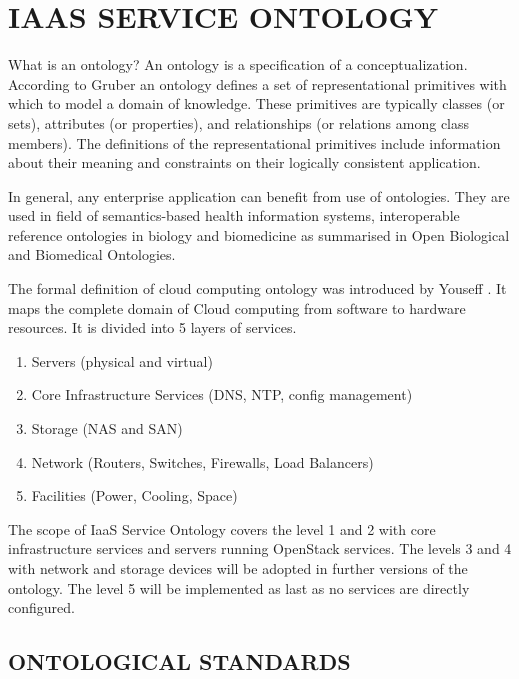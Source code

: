 
\section{IAAS SERVICE ONTOLOGY}
\label{chap:ontology}

What is an ontology? An ontology is a specification of a conceptualization. According to Gruber \cite{OntologyDefinition} an ontology defines a set of representational primitives with which to model a domain of knowledge. These  primitives are typically classes (or sets), attributes (or properties), and relationships (or relations among class members). The definitions of the representational primitives include information about their meaning and constraints on their logically consistent application.



In general, any enterprise application can benefit from use of ontologies. They are used in field of semantics-based health information systems, interoperable reference ontologies in biology and biomedicine as summarised in Open Biological and Biomedical Ontologies\cite{OBO}.

The formal definition of cloud computing ontology was introduced by Youseff \cite{OntologyComputing}. It maps the complete domain of Cloud computing from software to hardware resources. It is divided into 5 layers of services.

\begin{enumerate}
 \item Servers (physical and virtual)
 \item Core Infrastructure Services (DNS, NTP, config management) 
 \item Storage (NAS and SAN)
 \item Network (Routers, Switches, Firewalls, Load Balancers)
 \item Facilities (Power, Cooling, Space)
\end{enumerate}

The scope of IaaS Service Ontology covers the level 1 and 2 with core infrastructure services and servers running OpenStack services. The levels 3 and 4 with network and storage devices will be adopted in further versions of the ontology. The level 5 will be implemented as last as no services are directly configured.

\subsection{ONTOLOGICAL STANDARDS}

